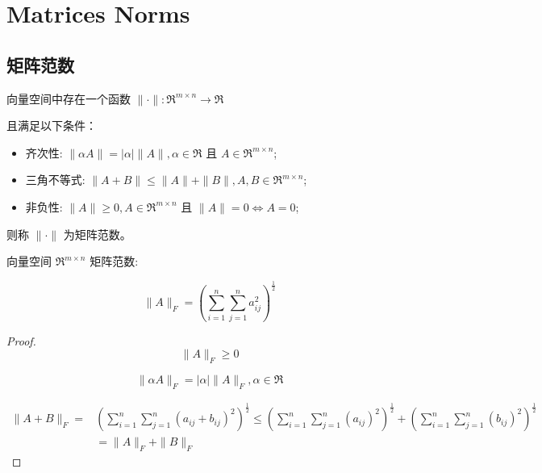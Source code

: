 \chapter{Matrices Norms}

\section{矩阵范数}

\begin{definition}
    向量空间中存在一个函数 $ \|\cdot\|: \mathfrak{R}^{m \times n} \rightarrow \mathfrak{R} $

    且满足以下条件：

    \begin{itemize}
        \item 齐次性: $ \|\alpha A\|=|\alpha|\|A\|, \alpha \in \mathfrak{R} $ 且 $ A \in \mathfrak{R}^{m \times n} $;
        \item 三角不等式: $ \|A+B\| \leq\|A\|+\|B\|, A, B \in \mathfrak{R}^{m \times n} $;
        \item 非负性: $ \|A\| \geq 0, A \in \mathfrak{R}^{m \times n} $ 且 $ \|A\|=0 \Leftrightarrow A=0 $;
    \end{itemize}

则称 $ \|\cdot\| $ 为矩阵范数。 
\end{definition}

向量空间 $ \mathfrak{R}^{m \times n} $ 矩阵范数:

\begin{example}
    \begin{equation} \|A\|_{F}=\left(\sum_{i=1}^{n} \sum_{j=1}^{n} a_{i j}^{2}\right)^{\frac{1}{2}} \end{equation}
\end{example}

\begin{proof}
    \begin{equation} \|A\|_{F} \geq 0 \end{equation}

    \begin{equation} \|\alpha A\|_{F}=|\alpha|\|A\|_{F}, \alpha \in \mathfrak{R} \end{equation}

    \begin{equation} \begin{aligned}\|A+B\|_{F}=&\left(\sum_{i=1}^{n} \sum_{j=1}^{n}\left(a_{i j}+b_{i j}\right)^{2}\right)^{\frac{1}{2}} \leq\left(\sum_{i=1}^{n} \sum_{j=1}^{n}\left(a_{i j}\right)^{2}\right)^{\frac{1}{2}}+\left(\sum_{i=1}^{n} \sum_{j=1}^{n}\left(b_{i j}\right)^{2}\right)^{\frac{1}{2}} \\ &=\|A\|_{F}+\|B\|_{F} \end{aligned} \end{equation}
\end{proof}

